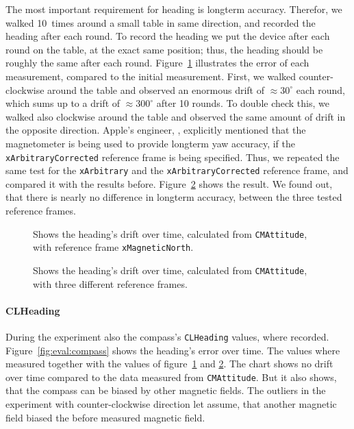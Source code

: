 The most important requirement for heading is longterm accuracy. Therefor, we walked 10~times around a small table in same direction, and recorded the heading after each round. To record the heading we put the device after each round on the table, at the exact same position; thus, the heading should be roughly the same after each round. Figure~\ref{fig:evalAttitude:xMagneticNorth} illustrates the error of each measurement, compared to the initial measurement. First, we walked counter-clockwise around the table and observed an enormous drift of $\approx 30^{\circ}$ each round, which sums up to a drift of $\approx 300^{\circ}$ after 10 rounds. To double check this, we walked also clockwise around the table and observed the same amount of drift in the opposite direction. Apple's engineer, \citet{apple:wwdc_2012_pham}, explicitly mentioned that the magnetometer is being used to provide longterm yaw accuracy, if the \texttt{xArbitraryCorrected} reference frame is being specified. Thus, we repeated the same test for the \texttt{xArbitrary} and the \texttt{xArbitraryCorrected} reference frame, and compared it with the results before. Figure~\ref{fig:evalAttitude:referenceframes} shows the result. We found out, that there is nearly no difference in longterm accuracy, between the three tested reference frames.


\begin{figure}[htbp]
	
	\caption{Shows the heading's drift over time, calculated from \texttt{CMAttitude}, with reference frame \texttt{xMagneticNorth}.}
	\label{fig:evalAttitude:xMagneticNorth}
\end{figure}

\begin{figure}[htbp]
	
	\caption{Shows the heading's drift over time, calculated from \texttt{CMAttitude}, with three different reference frames.}
	\label{fig:evalAttitude:referenceframes}
\end{figure}

\paragraph{CLHeading} During the experiment also the compass's \texttt{CLHeading} values, where recorded. Figure~\ref{fig:eval:compass} shows the heading's error over time. The values where measured together with the values of figure~\ref{fig:evalAttitude:xMagneticNorth} and \ref{fig:evalAttitude:referenceframes}. The chart shows no drift over time compared to the data measured from \texttt{CMAttitude}. But it also shows, that the compass can be biased by other magnetic fields. The outliers in the experiment with counter-clockwise direction let assume, that another magnetic field biased the before measured magnetic field.

